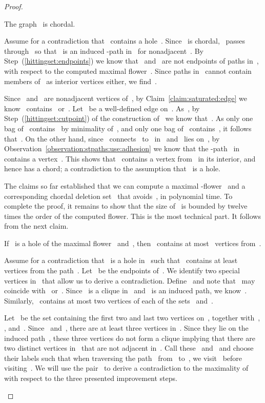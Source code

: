 \begin{proof}
\begin{claim} \label{claim:s:hittingset}
The graph~ is chordal.
\end{claim}
\begin{claimproof}
Assume for a contradiction that~ contains a hole~. Since~ is chordal,~ passes through~ so that~ is an induced -path in~ for nonadjacent~. By Step~(\ref{hittingset:endpoints}) we know that~ and~ are not endpoints of paths in~, with respect to the computed maximal flower~. Since paths in~ cannot contain members of~ as interior vertices either, we find~.

Since~ and~ are nonadjacent vertices of~, by Claim~\ref{claim:saturated:edge} we know~ contains~ or~. Let~ be a well-defined edge on~. As~, by Step~(\ref{hittingset:cutpoint}) of the construction of~ we know that~. As only one bag of~ contains~ by minimality of~, and only one bag of~ contains~, it follows that~. On the other hand, since~ connects~ to~ in~ and~ lies on~, by Observation~\ref{observation:stpaths:use:adhesion} we know that the -path~ in~ contains a vertex~. This shows that~ contains a vertex from~ in its interior, and hence has a chord; a contradiction to the assumption that~ is a hole.
\end{claimproof}

The claims so far established that we can compute a maximal -flower~ and a corresponding chordal deletion set~ that avoids~, in polynomial time. To complete the proof, it remains to show that the size of~ is bounded by twelve times the order of the computed flower. This is the most technical part. It follows from the next claim.

\begin{claim} \label{claim:twelve:from:path}
If~ is a hole of the maximal flower~ and~, then~ contains at most~ vertices from~.
\end{claim}
\begin{claimproof}
Assume for a contradiction that~ is a hole in~ such that~ contains at least~ vertices from the path~. Let~ be the endpoints of~. We identify two special vertices in~ that allow us to derive a contradiction. Define~ and note that~ may coincide with~ or~. Since~ is a clique in~ and~ is an induced path, we know~. Similarly,~ contains at most two vertices of each of the sets~ and~.

Let~ be the set containing the first two and last two vertices on~, together with~, , and~. Since~ and~, there are at least three vertices in~. Since they lie on the induced path~, these three vertices do not form a clique implying that there are two distinct vertices in~ that are not adjacent in~. Call these~ and~ and choose their labels such that when traversing the path~ from~ to~, we visit~ before visiting~. We will use the pair~ to derive a contradiction to the maximality of~ with respect to the three presented improvement steps.


\end{claimproof}
\end{proof}
